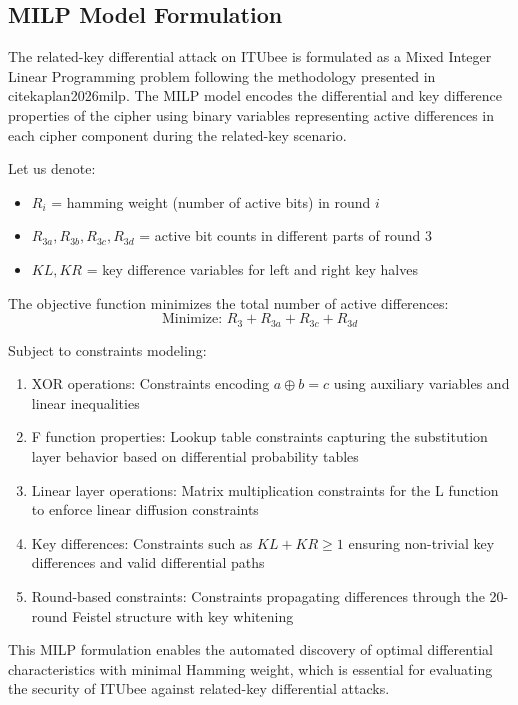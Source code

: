 \documentclass[11pt,a4paper]{article}
\begin{document}
\subsection{MILP Model Formulation}
The related-key differential attack on ITUbee is formulated as a Mixed Integer Linear Programming problem following the methodology presented in \\cite{kaplan2026milp}. The MILP model encodes the differential and key difference properties of the cipher using binary variables representing active differences in each cipher component during the related-key scenario.

Let us denote:
\begin{itemize}
    \item $R_i$ = hamming weight (number of active bits) in round $i$
    \item $R_{3a}, R_{3b}, R_{3c}, R_{3d}$ = active bit counts in different parts of round 3
    \item $KL, KR$ = key difference variables for left and right key halves
\end{itemize}

The objective function minimizes the total number of active differences:
\begin{equation}
\text{Minimize: } R_3 + R_{3a} + R_{3c} + R_{3d}
\end{equation}

Subject to constraints modeling:
\begin{enumerate}
    \item XOR operations: Constraints encoding $a \oplus b = c$ using auxiliary variables and linear inequalities
    \item F function properties: Lookup table constraints capturing the substitution layer behavior based on differential probability tables
    \item Linear layer operations: Matrix multiplication constraints for the L function to enforce linear diffusion constraints
    \item Key differences: Constraints such as $KL + KR \geq 1$ ensuring non-trivial key differences and valid differential paths
    \item Round-based constraints: Constraints propagating differences through the 20-round Feistel structure with key whitening
\end{enumerate}

This MILP formulation enables the automated discovery of optimal differential characteristics with minimal Hamming weight, which is essential for evaluating the security of ITUbee against related-key differential attacks.
\end{document}
